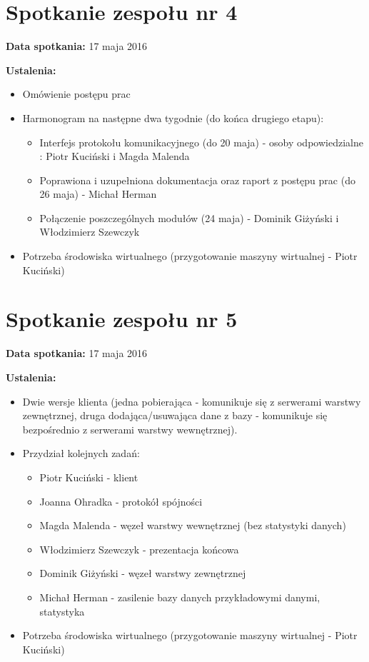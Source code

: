\section{Spotkanie zespołu nr 4}

\textbf{Data spotkania:} 17 maja 2016

\textbf{Ustalenia:}

\begin{itemize}
\item Omówienie postępu prac
\item Harmonogram na następne dwa tygodnie (do końca drugiego etapu):
	\begin{itemize}
	\item Interfejs protokołu komunikacyjnego (do 20 maja) - osoby odpowiedzialne : Piotr Kuciński i Magda Malenda
	\item Poprawiona i uzupełniona dokumentacja oraz raport z postępu prac (do 26 maja) - Michał Herman
	\item Połączenie poszczególnych modułów (24 maja) - Dominik Giżyński i Włodzimierz Szewczyk
	\end{itemize}
\item Potrzeba środowiska wirtualnego (przygotowanie maszyny wirtualnej - Piotr Kuciński)
\end{itemize}


\section{Spotkanie zespołu nr 5}

\textbf{Data spotkania:} 17 maja 2016

\textbf{Ustalenia:}

\begin{itemize}
\item Dwie wersje klienta (jedna pobierająca - komunikuje się z serwerami warstwy zewnętrznej, druga dodająca/usuwająca dane z bazy - komunikuje się bezpośrednio z serwerami warstwy wewnętrznej).
\item Przydział kolejnych zadań:
	\begin{itemize}
	\item Piotr Kuciński - klient
	\item Joanna Ohradka - protokół spójności
	\item Magda Malenda - węzeł warstwy wewnętrznej (bez statystyki danych)
	\item Włodzimierz Szewczyk - prezentacja końcowa
	\item Dominik Giżyński - węzeł warstwy zewnętrznej
	\item Michał Herman - zasilenie bazy danych przykładowymi danymi, statystyka
	\end{itemize}
\item Potrzeba środowiska wirtualnego (przygotowanie maszyny wirtualnej - Piotr Kuciński)
\end{itemize}